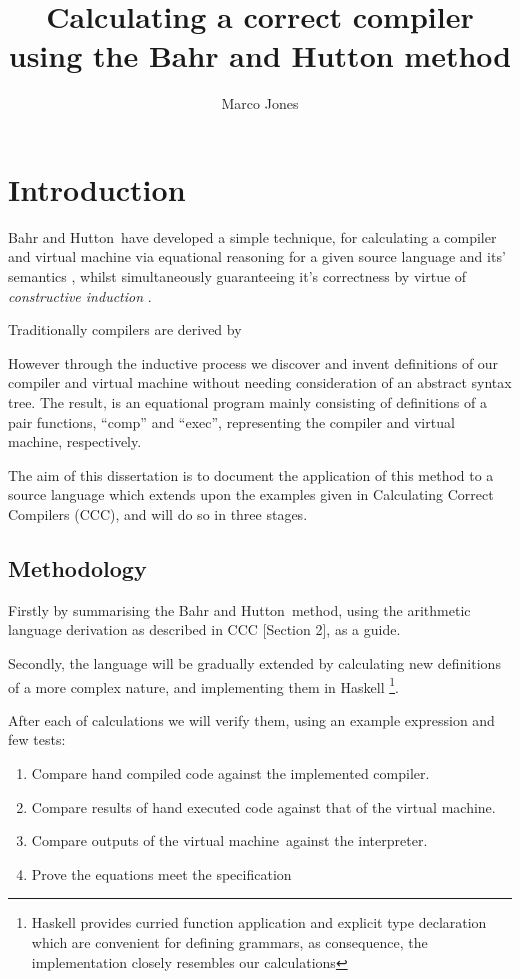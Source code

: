 \documentclass {article}
\title{Calculating a correct compiler using the Bahr and Hutton method}
\author{Marco Jones}
\date{}
\begin{document}
\maketitle


\newcommand{\BH}{Bahr and Hutton}
\newcommand{\vm}{virtual machine}

\section{Introduction}
\BH\ have developed a simple technique, for
calculating a compiler and virtual machine via equational reasoning
for a given source language and its' semantics \cite{bandh}, 
whilst simultaneously guaranteeing it's correctness by virtue 
of \emph{constructive induction} \cite{backhouse}.

Traditionally compilers are derived by %

However through the inductive process we discover and invent definitions
of our compiler and virtual machine without needing consideration of an 
abstract syntax tree.
The result, is an equational program mainly consisting of
definitions of a pair functions,  ``comp'' and ``exec'',
representing the compiler and virtual machine, respectively.

The aim of this dissertation is to document the
application of this method
to a source language which extends upon the examples given in
Calculating Correct Compilers (CCC),
and will do so in three stages.

\subsection{Methodology}

Firstly by summarising the \BH\ method,
using the arithmetic language derivation as described in
CCC [Section 2], as a guide.

Secondly, the language will be gradually extended
by calculating new definitions of a more complex nature,
and implementing them in Haskell
\footnote{Haskell provides curried function application
		and explicit type declaration which are
		convenient for defining grammars,
		as consequence, the implementation closely
		resembles our calculations}.

After each of calculations we will verify
them, using an example expression
and few tests:

\begin{enumerate}
	\item Compare hand compiled code against the
		implemented compiler.
	\item Compare results of hand executed code 
		against that of the \vm.
	\item Compare outputs of the \vm\ against the interpreter.
	\item Prove the equations meet the specification\cite[page 14]{bandh}
\end{enumerate}
\end{document}
